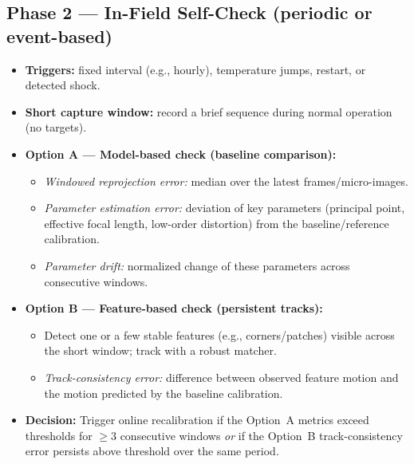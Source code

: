 \documentclass[12pt]{scrartcl}
\begin{document}
\subsection*{Phase 2 — In-Field Self-Check (periodic or event-based)}
\begin{itemize}
  \item \textbf{Triggers:} fixed interval (e.g., hourly), temperature jumps, restart, or detected shock.
  \item \textbf{Short capture window:} record a brief sequence during normal operation (no targets).
  \item \textbf{Option A — Model-based check (baseline comparison):}
    \begin{itemize}
      \item \emph{Windowed reprojection error:} median over the latest frames/micro-images.
      \item \emph{Parameter estimation error:} deviation of key parameters (principal point, effective focal length, low-order distortion) from the baseline/reference calibration.
      \item \emph{Parameter drift:} normalized change of these parameters across consecutive windows.
    \end{itemize}
  \item \textbf{Option B — Feature-based check (persistent tracks):}
    \begin{itemize}
      \item Detect one or a few stable features (e.g., corners/patches) visible across the short window; track with a robust matcher.
      \item \emph{Track-consistency error:} difference between observed feature motion and the motion predicted by the baseline calibration.
    \end{itemize}
  \item \textbf{Decision:} Trigger online recalibration if the Option~A metrics exceed thresholds for $\geq 3$ consecutive windows
        \emph{or} if the Option~B track-consistency error persists above threshold over the same period.
\end{itemize}
\end{document}

